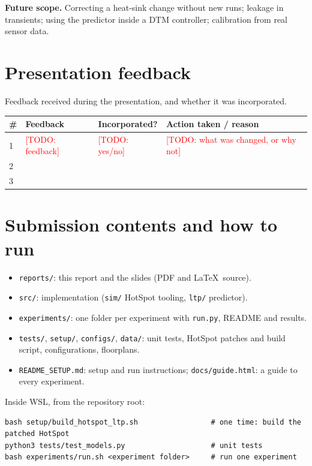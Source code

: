 \documentclass[11pt,a4paper]{article}
\newcommand{\todo}[1]{\textcolor{red}{[TODO: #1]}}
\begin{document}
\textbf{Future scope.} Correcting a heat-sink change without new runs; leakage in transients;
using the predictor inside a DTM controller; calibration from real sensor data.

\section{Presentation feedback}
Feedback received during the presentation, and whether it was incorporated.
\begin{center}
\small
\begin{tabular}{@{}p{0.6cm} p{6.5cm} p{2.2cm} p{5.2cm}@{}}
\toprule
\# & Feedback & Incorporated? & Action taken / reason \\
\midrule
1 & \todo{feedback} & \todo{yes/no} & \todo{what was changed, or why not} \\
2 & & & \\
3 & & & \\
\bottomrule
\end{tabular}
\end{center}

\section{Submission contents and how to run}
\begin{itemize}
  \item \texttt{reports/}: this report and the slides (PDF and \LaTeX\ source).
  \item \texttt{src/}: implementation (\texttt{sim/} HotSpot tooling, \texttt{ltp/} predictor).
  \item \texttt{experiments/}: one folder per experiment with \texttt{run.py}, README and results.
  \item \texttt{tests/}, \texttt{setup/}, \texttt{configs/}, \texttt{data/}: unit tests, HotSpot
        patches and build script, configurations, floorplans.
  \item \texttt{README\_SETUP.md}: setup and run instructions; \texttt{docs/guide.html}: a guide
        to every experiment.
\end{itemize}
Inside WSL, from the repository root:
{\small\begin{verbatim}
bash setup/build_hotspot_ltp.sh                 # one time: build the patched HotSpot
python3 tests/test_models.py                    # unit tests
bash experiments/run.sh <experiment folder>     # run one experiment
\end{verbatim}}
\end{document}
